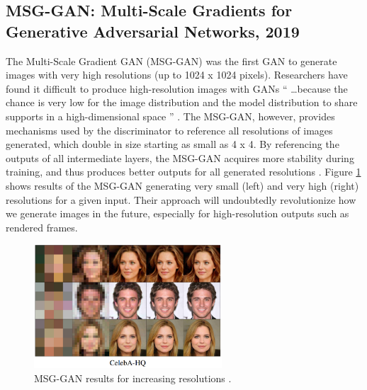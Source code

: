 \documentclass[letterpaper]{article} %
\begin{document}

\subsection{MSG-GAN: Multi-Scale Gradients for Generative Adversarial
Networks, 2019}
The Multi-Scale Gradient GAN (MSG-GAN) was the first GAN to generate images 
with very high resolutions (up to 1024 x 1024 pixels).
Researchers have found it difficult to produce high-resolution images with GANs
``
\dots because the chance is
very low for the image distribution and the model distribution
to share supports in a high-dimensional space
'' \cite{stackgan++}.
The MSG-GAN, however, provides mechanisms used by the discriminator to 
reference all resolutions of images generated, which double in size starting as 
small as 4 x 4. By referencing the outputs of all intermediate layers, the 
MSG-GAN acquires more stability during training, and thus produces better 
outputs for all generated resolutions
\cite{msggan}. Figure \ref{fig:msggan} shows results of the MSG-GAN generating 
very small (left) and very high (right) resolutions for a given input.
Their approach will undoubtedly revolutionize how we generate images in the 
future, especially for high-resolution outputs such as rendered frames.

\begin{figure}[htbp]
	\centerline{\includegraphics[width=7cm]{msggan.png}}
	\caption{MSG-GAN results for increasing resolutions
		\cite{msggan}.}
	\label{fig:msggan}
\end{figure}
\end{document}
